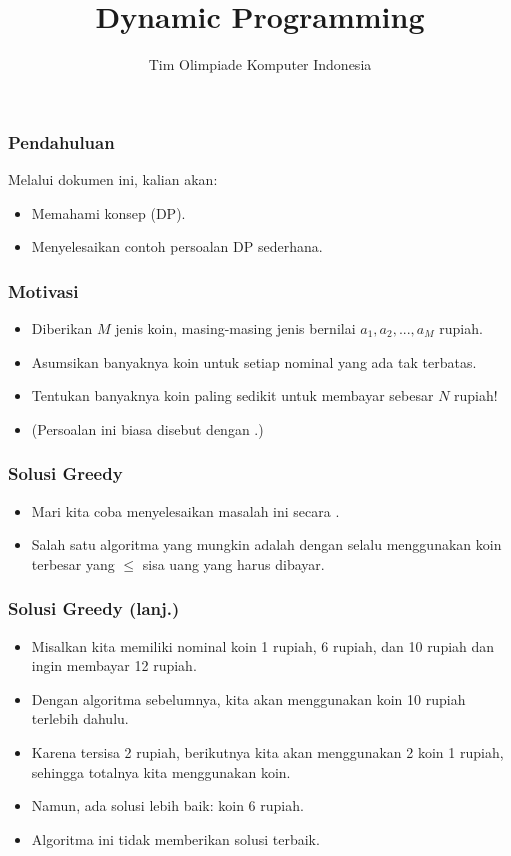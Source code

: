 

\title{Dynamic Programming}
\author{Tim Olimpiade Komputer Indonesia}
\date{}

\usepackage{qtree}


\begin{frame}
\titlepage
\end{frame}

\begin{frame}
\frametitle{Pendahuluan}
Melalui dokumen ini, kalian akan:
\begin{itemize}
  \item Memahami konsep \newTerm{\fdp} (DP).
  \item Menyelesaikan contoh persoalan DP sederhana.
\end{itemize}
\end{frame}

\begin{frame}
\frametitle{Motivasi}
\begin{itemize}
  \item Diberikan $M$ jenis koin, masing-masing jenis bernilai $a_1, a_2, ..., a_M$ rupiah.
  \item Asumsikan banyaknya koin untuk setiap nominal yang ada tak terbatas. 
  \item Tentukan banyaknya koin paling sedikit untuk membayar  sebesar $N$ rupiah!
  \item (Persoalan ini biasa disebut dengan .)
\end{itemize}
\end{frame}

\begin{frame}
\frametitle{Solusi Greedy}
\begin{itemize}
  \item Mari kita coba menyelesaikan masalah ini secara \fgreedy.
  \item Salah satu algoritma \fgreedy yang mungkin adalah dengan selalu menggunakan koin terbesar yang $\leq$ sisa uang yang harus dibayar.
\end{itemize}
\end{frame}

\begin{frame}
\frametitle{Solusi Greedy (lanj.)}
\begin{itemize}
  \item Misalkan kita memiliki nominal koin 1 rupiah, 6 rupiah, dan 10 rupiah dan ingin membayar 12 rupiah.
  \item Dengan algoritma sebelumnya, kita akan menggunakan koin 10 rupiah terlebih dahulu. 
  \item Karena tersisa 2 rupiah, berikutnya kita akan menggunakan 2 koin 1 rupiah, sehingga totalnya kita menggunakan  koin.
  \item Namun, ada solusi lebih baik:  koin 6 rupiah.
  \item Algoritma \fgreedy ini tidak memberikan solusi terbaik.
\end{itemize}
\end{frame}


